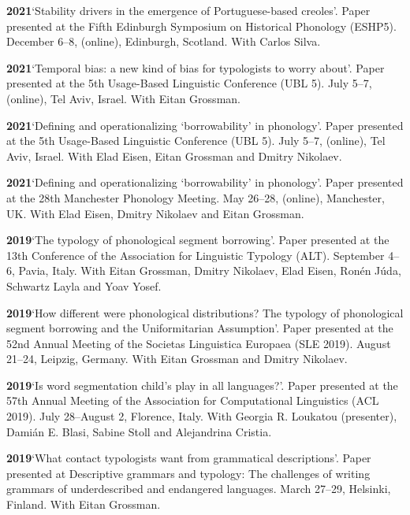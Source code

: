 \documentclass[11pt]{article}
\newcommand{\hangpara}{
 \setlength{\parindent}{0in} %
 \hangindent=0.42in %
}
\begin{document}
\hangpara
\vskip 6pt
{\bf 2021}\hspace{1ex}`Stability drivers in the emergence of Portuguese-based creoles'. Paper presented at the Fifth Edinburgh Symposium on Historical Phonology (ESHP5). December 6--8, (online), Edinburgh, Scotland. With Carlos Silva.

\hangpara
\vskip 6pt
{\bf 2021}\hspace{1ex}`Temporal bias: a new kind of bias for typologists to worry about'. Paper presented at the 5th Usage-Based Linguistic Conference (UBL 5). July 5--7, (online), Tel Aviv, Israel. With Eitan Grossman.

\hangpara
\vskip 6pt
{\bf 2021}\hspace{1ex}`Defining and operationalizing `borrowability' in phonology'. Paper presented at the 5th Usage-Based Linguistic Conference (UBL 5). July 5--7, (online), Tel Aviv, Israel. With Elad Eisen, Eitan Grossman and Dmitry Nikolaev.

\hangpara
\vskip 6pt
{\bf 2021}\hspace{1ex}`Defining and operationalizing `borrowability' in phonology'. Paper presented at the 28th Manchester Phonology Meeting. May 26--28, (online), Manchester, UK. With Elad Eisen, Dmitry Nikolaev and Eitan Grossman.

\hangpara
\vskip 6pt
{\bf 2019}\hspace{1ex}`The typology of phonological segment borrowing'. Paper presented at the 13th Conference of the Association for Linguistic Typology (ALT). September 4--6, Pavia, Italy. With Eitan Grossman, Dmitry Nikolaev, Elad Eisen, Ronén Júda, Schwartz Layla and Yoav Yosef.

\hangpara
\vskip 6pt
{\bf 2019}\hspace{1ex}`How different were phonological distributions? The typology of phonological segment borrowing and the Uniformitarian Assumption'. Paper presented at the 52nd Annual Meeting of the Societas Linguistica Europaea (SLE 2019). August 21--24, Leipzig, Germany. With Eitan Grossman and Dmitry Nikolaev.

\vskip 6pt
\hangpara
{\bf 2019}\hspace{1ex}`Is word segmentation child's play in all languages?'. Paper presented at the 57th Annual Meeting of the Association for Computational Linguistics (ACL 2019). July 28--August 2, Florence, Italy. With Georgia R. Loukatou (presenter), Dami{\'a}n E. Blasi, Sabine Stoll and Alejandrina Cristia.

\hangpara
\vskip 6pt
{\bf 2019}\hspace{1ex}`What contact typologists want from grammatical descriptions'. Paper presented at Descriptive grammars and typology: The challenges of writing grammars of underdescribed and endangered languages. March 27--29, Helsinki, Finland. With Eitan Grossman.
\end{document}
